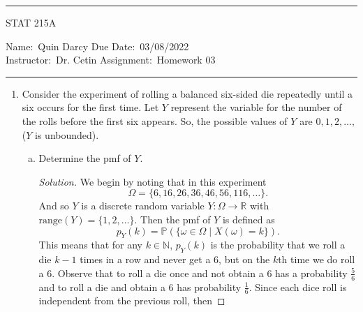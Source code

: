 \documentclass[12pt]{article}
\newenvironment{solution}
{\renewcommand\qedsymbol{$\blacksquare$}\begin{proof}[Solution]}
{\end{proof}}
\begin{document}
    \thispagestyle{empty}\hrule

    \begin{center}
        \vspace{.4cm} { \large STAT 215A}
    \end{center}
    {Name:\ Quin Darcy \hspace{\fill} Due Date:\ 03/08/2022   \\
    { Instructor:}\ Dr. Cetin \hspace{\fill} Assignment:\
    Homework 03 \\ \hrule}

    \begin{enumerate} 
        \item Consider the experiment of rolling a balanced six-sided die
            repeatedly until a six occurs for the first time. Let $Y$ represent
            the variable for the number of the rolls before the first six
            appears. So, the possible values of $Y$ are $0, 1, 2, \dots, $ ($Y$
            is unbounded).
            \begin{enumerate}[(a)]
                \item Determine the pmf of $Y$.
                    \begin{solution}
                        We begin by noting that in this experiment 
                        \begin{equation*}
                            \Omega=\{6, 16, 26, 36, 46, 56, 116, \dots\}.
                        \end{equation*}
                        And so $Y$ is a discrete random variable
                        $Y:\Omega\to\mathbb{R}$ with $\text{range}(Y)=\{1, 2,
                        \dots\}$. Then the pmf of $Y$ is defined as
                        \begin{equation*}
                            p_Y(k)=\mathbb{P}(\{\omega\in\Omega\mid
                            X(\omega)=k\}).
                        \end{equation*}
                        This means that for any $k\in\mathbb{N}$, $p_Y(k)$ is
                        the probability that we roll a die $k-1$ times in a row and
                        never get a 6, but on the $k$th time we do roll a 6.
                        Observe that to roll a die once and not obtain a 6 has
                        a probability $\frac{5}{6}$ and to roll a die and
                        obtain a 6 has probability $\frac{1}{6}$. Since each
                        dice roll is independent from the previous roll, then

\end{solution}
\end{enumerate}
\end{enumerate}
\end{document}
